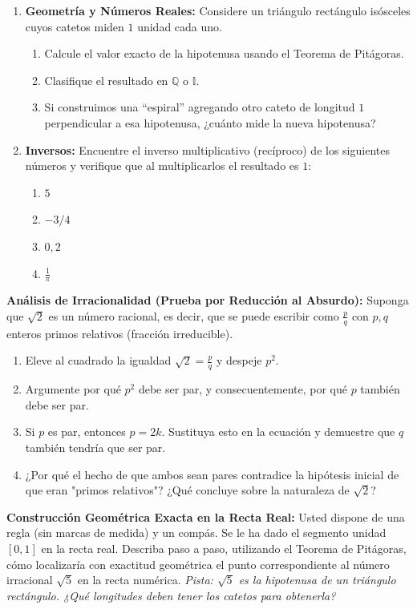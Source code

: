 \begin{enumerate}
    \item \textbf{Geometría y Números Reales:}
    Considere un triángulo rectángulo isósceles cuyos catetos miden $1$ unidad cada uno.
    \begin{enumerate}
        \item Calcule el valor exacto de la hipotenusa usando el Teorema de Pitágoras.
        \item Clasifique el resultado en $\mathbb{Q}$ o $\mathbb{I}$.
        \item Si construimos una ``espiral'' agregando otro cateto de longitud $1$ perpendicular a esa hipotenusa, ¿cuánto mide la nueva hipotenusa?
    \end{enumerate}

    \item \textbf{Inversos:}
    Encuentre el inverso multiplicativo (recíproco) de los siguientes números y verifique que al multiplicarlos el resultado es $1$:
    \begin{enumerate}
        \item $5$
        \item $-3/4$
        \item $0,2$
        \item $\frac{1}{\pi}$
    \end{enumerate}
\end{enumerate}

\item \textbf{Análisis de Irracionalidad (Prueba por Reducción al Absurdo):}
    Suponga que $\sqrt{2}$ es un número racional, es decir, que se puede escribir como $\frac{p}{q}$ con $p, q$ enteros primos relativos (fracción irreducible).
    \begin{enumerate}
        \item Eleve al cuadrado la igualdad $\sqrt{2} = \frac{p}{q}$ y despeje $p^2$.
        \item Argumente por qué $p^2$ debe ser par, y consecuentemente, por qué $p$ también debe ser par.
        \item Si $p$ es par, entonces $p=2k$. Sustituya esto en la ecuación y demuestre que $q$ también tendría que ser par.
        \item ¿Por qué el hecho de que ambos sean pares contradice la hipótesis inicial de que eran "primos relativos"? ¿Qué concluye sobre la naturaleza de $\sqrt{2}$?
    \end{enumerate}

    \item \textbf{Construcción Geométrica Exacta en la Recta Real:}
    Usted dispone de una regla (sin marcas de medida) y un compás. Se le ha dado el segmento unidad $[0,1]$ en la recta real.
    Describa paso a paso, utilizando el Teorema de Pitágoras, cómo localizaría con exactitud geométrica el punto correspondiente al número irracional $\sqrt{5}$ en la recta numérica.
    \textit{Pista: $\sqrt{5}$ es la hipotenusa de un triángulo rectángulo. ¿Qué longitudes deben tener los catetos para obtenerla?}

